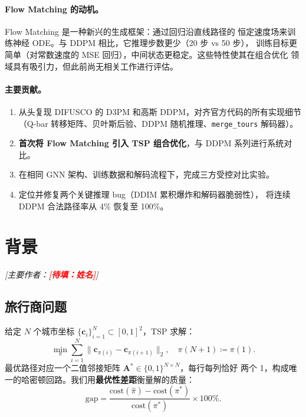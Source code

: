 \documentclass[11pt,a4paper]{article}
\newcommand{\TODO}[1]{\textcolor{red}{\textbf{[待填：#1]}}}
\begin{document}
\paragraph{Flow Matching 的动机。}
Flow Matching \citep{lipman2022flow} 是一种新兴的生成框架：通过回归沿直线路径的
恒定速度场来训练神经 ODE。与 DDPM 相比，它推理步数更少（20 步 vs 50 步），
训练目标更简单（对常数速度的 MSE 回归），中间状态更稳定。这些特性使其在组合优化
领域具有吸引力，但此前尚无相关工作进行评估。

\paragraph{主要贡献。}
\begin{enumerate}
  \item 从头复现 DIFUSCO 的 D3PM 和高斯 DDPM，对齐官方代码的所有实现细节
        （Q-bar 转移矩阵、贝叶斯后验、DDPM 随机推理、\texttt{merge\_tours} 解码器）。
  \item \textbf{首次将 Flow Matching 引入 TSP 组合优化}，与 DDPM 系列进行系统对比。
  \item 在相同 GNN 架构、训练数据和解码流程下，完成三方受控对比实验。
  \item 定位并修复两个关键推理 bug（DDIM 累积爆炸和解码器脆弱性），
        将连续 DDPM 合法路径率从 4\% 恢复至 100\%。
\end{enumerate}


\section{背景}
\label{sec:background}
\textit{[主要作者：\TODO{姓名}]}

\subsection{旅行商问题}
给定 $N$ 个城市坐标 $\{\mathbf{c}_i\}_{i=1}^N \subset [0,1]^2$，TSP 求解：
\begin{equation}
  \min_\pi \sum_{i=1}^N \|\mathbf{c}_{\pi(i)} - \mathbf{c}_{\pi(i+1)}\|_2,
  \quad \pi(N+1) \coloneqq \pi(1).
\end{equation}
最优路径对应一个二值邻接矩阵 $\mathbf{A}^* \in \{0,1\}^{N\times N}$，每行每列恰好
两个 1，构成唯一的哈密顿回路。我们用\textbf{最优性差距}衡量解的质量：
\begin{equation}
  \text{gap} = \frac{\text{cost}(\hat\pi) - \text{cost}(\pi^*)}{\text{cost}(\pi^*)} \times 100\%.
\end{equation}
\end{document}
